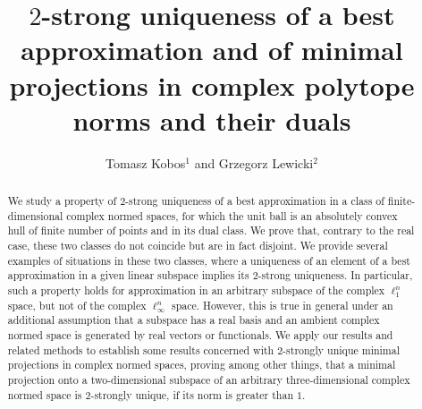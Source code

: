 \documentclass[12pt, reqno]{amsart}
\theoremstyle{definition}
\theoremstyle{remark}
\numberwithin{equation}{section}
\begin{document}
\setcounter{page}{1}

\title[$2$-strong uniqueness of a best approximation and minimal projections]{$2$-strong uniqueness of a best approximation and of minimal projections in complex polytope norms and their duals}

\author[T. Kobos \MakeLowercase{and} G. Lewicki]
{Tomasz Kobos$^1$ \MakeLowercase{and} Grzegorz Lewicki$^2$}
\address{$^1$Faculty of Mathematics and Computer Science, Jagiellonian University, \L ojasiewicza 6, 30-348 Krak\'ow, Poland}
\address{$^2$Faculty of Mathematics and Computer Science, Jagiellonian University, \L ojasiewicza 6, 30-348 Krak\'ow, Poland}

\keywords{}
\begin{abstract}
We study a property of $2$-strong uniqueness of a best approximation in a class of finite-dimensional complex normed spaces, for which the unit ball is an absolutely convex hull of finite number of points and in its dual class. We prove that, contrary to the real case, these two classes do not coincide but are in fact disjoint. We provide several examples of situations in these two classes, where a uniqueness of an element of a best approximation in a given linear subspace implies its $2$-strong uniqueness. In particular, such a property holds for approximation in an arbitrary subspace of the complex $\ell_1^n$ space, but not of the complex $\ell_{\infty}^n$ space. However, this is true in general under an additional assumption that a subspace has a real basis and an ambient complex normed space is generated by real vectors or functionals. We apply our results and related methods to establish some results concerned with $2$-strongly unique minimal projections in complex normed spaces, proving among other things, that a minimal projection onto a two-dimensional subspace of an arbitrary three-dimensional complex normed space is $2$-strongly unique, if its norm is greater than $1$.
\end{abstract} \maketitle
\end{document}
